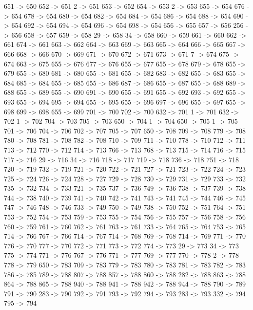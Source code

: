 {	651 -> 650
	652 -> 651
	2 -> 651
	653 -> 652
	654 -> 653
	2 -> 653
	655 -> 654
	676 -> 654
	678 -> 654
	680 -> 654
	682 -> 654
	684 -> 654
	686 -> 654
	688 -> 654
	690 -> 654
	692 -> 654
	694 -> 654
	696 -> 654
	698 -> 654
	656 -> 655
	657 -> 656
	256 -> 656
	658 -> 657
	659 -> 658
	29 -> 658
	34 -> 658
	660 -> 659
	661 -> 660
	662 -> 661
	674 -> 661
	663 -> 662
	664 -> 663
	669 -> 663
	665 -> 664
	666 -> 665
	667 -> 666
	668 -> 666
	670 -> 669
	671 -> 670
	672 -> 671
	673 -> 671
	7 -> 674
	675 -> 674
	663 -> 675
	655 -> 676
	677 -> 676
	655 -> 677
	655 -> 678
	679 -> 678
	655 -> 679
	655 -> 680
	681 -> 680
	655 -> 681
	655 -> 682
	683 -> 682
	655 -> 683
	655 -> 684
	685 -> 684
	655 -> 685
	655 -> 686
	687 -> 686
	655 -> 687
	655 -> 688
	689 -> 688
	655 -> 689
	655 -> 690
	691 -> 690
	655 -> 691
	655 -> 692
	693 -> 692
	655 -> 693
	655 -> 694
	695 -> 694
	655 -> 695
	655 -> 696
	697 -> 696
	655 -> 697
	655 -> 698
	699 -> 698
	655 -> 699
	701 -> 700
	702 -> 700
	632 -> 701
	1 -> 701
	632 -> 702
	1 -> 702
	704 -> 703
	705 -> 703
	650 -> 704
	1 -> 704
	650 -> 705
	1 -> 705
	701 -> 706
	704 -> 706
	702 -> 707
	705 -> 707
	650 -> 708
	709 -> 708
	779 -> 708
	780 -> 708
	781 -> 708
	782 -> 708
	710 -> 709
	711 -> 710
	778 -> 710
	712 -> 711
	713 -> 712
	770 -> 712
	714 -> 713
	766 -> 713
	768 -> 713
	715 -> 714
	716 -> 715
	717 -> 716
	29 -> 716
	34 -> 716
	718 -> 717
	719 -> 718
	736 -> 718
	751 -> 718
	720 -> 719
	732 -> 719
	721 -> 720
	722 -> 721
	727 -> 721
	723 -> 722
	724 -> 723
	725 -> 724
	726 -> 724
	728 -> 727
	729 -> 728
	730 -> 729
	731 -> 729
	733 -> 732
	735 -> 732
	734 -> 733
	721 -> 735
	737 -> 736
	749 -> 736
	738 -> 737
	739 -> 738
	744 -> 738
	740 -> 739
	741 -> 740
	742 -> 741
	743 -> 741
	745 -> 744
	746 -> 745
	747 -> 746
	748 -> 746
	733 -> 749
	750 -> 749
	738 -> 750
	752 -> 751
	764 -> 751
	753 -> 752
	754 -> 753
	759 -> 753
	755 -> 754
	756 -> 755
	757 -> 756
	758 -> 756
	760 -> 759
	761 -> 760
	762 -> 761
	763 -> 761
	733 -> 764
	765 -> 764
	753 -> 765
	714 -> 766
	767 -> 766
	714 -> 767
	714 -> 768
	769 -> 768
	714 -> 769
	771 -> 770
	776 -> 770
	777 -> 770
	772 -> 771
	773 -> 772
	774 -> 773
	29 -> 773
	34 -> 773
	775 -> 774
	771 -> 776
	767 -> 776
	771 -> 777
	769 -> 777
	770 -> 778
	2 -> 778
	778 -> 779
	650 -> 783
	709 -> 783
	779 -> 783
	780 -> 783
	781 -> 783
	782 -> 783
	786 -> 785
	789 -> 788
	807 -> 788
	857 -> 788
	860 -> 788
	282 -> 788
	863 -> 788
	864 -> 788
	865 -> 788
	940 -> 788
	941 -> 788
	942 -> 788
	944 -> 788
	790 -> 789
	791 -> 790
	283 -> 790
	792 -> 791
	793 -> 792
	794 -> 793
	283 -> 793
	332 -> 794
	795 -> 794
}
